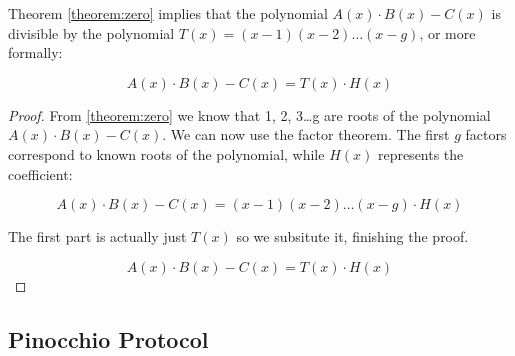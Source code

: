 \begin{theorem}
    \label{theorem:div}
    Theorem \ref{theorem:zero} implies that the polynomial $A(x) \cdot B(x) - C(x)$ is divisible by the polynomial $T(x) = (x-1)(x-2)\dots(x-g)$, or more formally:

    $$ A(x) \cdot B(x) - C(x) = T(x) \cdot H(x) $$

\end{theorem}

\begin{proof}
    From \ref{theorem:zero} we know that 1, 2, 3\dots g are roots of the polynomial $A(x) \cdot B(x) - C(x)$. We can now use the factor theorem. The first $g$ factors correspond to known roots of the polynomial, while $H(x)$ represents the coefficient:

    $$ A(x) \cdot B(x) - C(x) = (x-1)(x-2)\dots(x-g) \cdot H(x) $$

    \noindent The first part is actually just $T(x)$ so we subsitute it, finishing the proof.

    $$ A(x) \cdot B(x) - C(x) = T(x) \cdot H(x) $$

\end{proof}

\subsection{Pinocchio Protocol}

